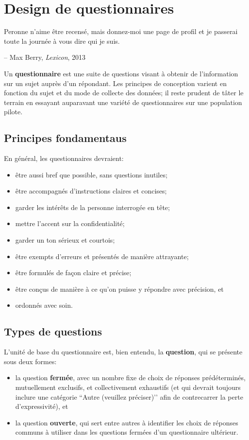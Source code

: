 \section{Design de questionnaires}
\begin{tcolorbox}[title=Un paradoxe de la vie moderne]
Peronne n'aime \^etre recens\'e, mais donnez-moi une page de profil et je passerai toute la journée à vous dire qui je suis. \\[-0.6cm]
\begin{flushright}
-- Max Berry, \textit{Lexicon}, 2013
\end{flushright}
\end{tcolorbox}
\noindent 
Un \textbf{questionnaire} est une suite de questions visant à obtenir de l'information sur un sujet auprès d'un répondant. Les principes de conception varient en fonction du sujet et du mode de collecte des données; il reste prudent de tâter le terrain en essayant auparavant une variété de questionnaires sur une population pilote.

\subsection{Principes fondamentaus} En général, les questionnaires devraient: 
\begin{itemize}[noitemsep] 
\item être aussi bref que possible, sans questions inutiles;
\item être accompagnés d'instructions claires et concises;
\item garder les intérêts de la personne interrogée en tête;
\item mettre l'accent sur la confidentialité;
\item garder un ton sérieux et courtois;
\item être exempts d'erreurs et présentés de manière attrayante;
\item être formulés de façon claire et précise; 
\item être conçus de manière à ce qu'on puisse y répondre avec précision, et 
\item ordonnés avec soin. 
\end{itemize}
\subsection{Types de questions} L'unité de base du questionnaire est, bien entendu, la \textbf{question}, qui se présente sous deux formes: 
\begin{itemize}[noitemsep]
\item la question \textbf{fermée}, avec un nombre fixe de choix de réponses prédéterminés, mutuellement exclusifs, et collectivement exhaustifs (et qui devrait toujours inclure une catégorie ``Autre (veuillez préciser)'’ afin de contrecarrer la perte d'expressivité), et
\item la question \textbf{ouverte}, qui sert entre autres à identifier les choix de réponses communs à utiliser dans les questions fermées d’un questionnaire ultérieur. 
\end{itemize}
